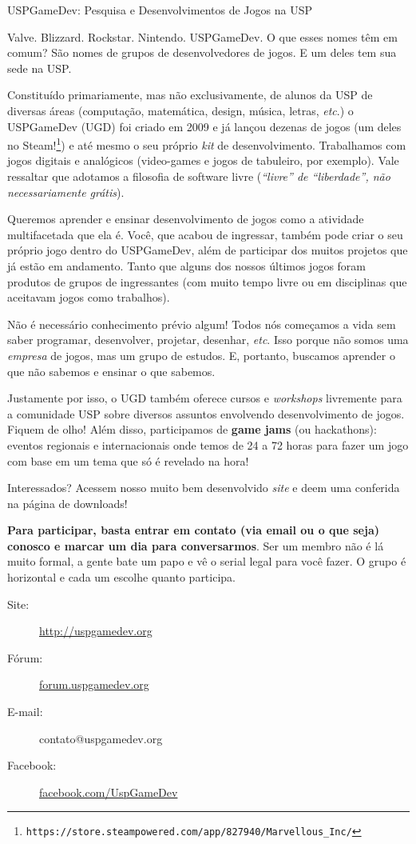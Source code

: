 \begin{subsecao}{USPGameDev: Pesquisa e Desenvolvimentos de Jogos na USP}


Valve. Blizzard. Rockstar. Nintendo. USPGameDev. O que esses nomes têm em comum?
São nomes de grupos de desenvolvedores de jogos. E um deles tem sua sede na USP.

Constituído primariamente, mas não exclusivamente, de alunos da USP de diversas
áreas (computação, matemática, design, música, letras, \textit{etc}.) o
USPGameDev (UGD) foi criado em 2009  e já lançou dezenas de jogos (um deles no 
Steam!\footnote{\texttt{https://store.steampowered.com/app/827940/Marvellous\_Inc/}}) 
e até mesmo o seu próprio \textit{kit} de desenvolvimento. Trabalhamos com jogos 
digitais e analógicos (video-games e jogos de tabuleiro, por exemplo). Vale 
ressaltar que adotamos a filosofia de software livre (\textit{``livre'' de 
``liberdade'', não necessariamente grátis}).

Queremos aprender e ensinar desenvolvimento de jogos como a atividade 
multifacetada que ela é. Você, que acabou de ingressar, também pode criar o seu 
próprio jogo dentro do USPGameDev, além de participar dos muitos projetos que já 
estão em andamento. Tanto que alguns dos nossos últimos jogos foram produtos de 
grupos de ingressantes (com muito tempo livre ou em disciplinas que aceitavam 
jogos como trabalhos). 

Não é necessário conhecimento prévio algum! Todos nós começamos a vida sem saber 
programar, desenvolver, projetar, desenhar, \textit{etc}. Isso porque não somos 
uma \textit{empresa} de jogos, mas um grupo de estudos. E, portanto, buscamos 
aprender o que não sabemos e ensinar o que sabemos.

Justamente por isso, o UGD também oferece cursos e \textit{workshops} livremente 
para a comunidade USP sobre diversos assuntos envolvendo desenvolvimento de 
jogos. Fiquem de olho! Além disso, participamos de \textbf{game jams} (ou 
hackathons): eventos regionais e internacionais onde temos de 24 a 72 horas para 
fazer um jogo com base em um tema que só é revelado na hora!

Interessados? Acessem nosso muito bem desenvolvido \textit{site} e deem uma 
conferida na página de downloads! 

\textbf{Para participar, basta entrar em contato (via email ou o que seja) 
conosco e marcar um dia para conversarmos}. Ser um membro não é lá muito formal, 
a gente bate um papo e vê o serial legal para você fazer. O grupo é horizontal e 
cada um escolhe quanto participa.

\begin{description}
  \item[Site:] \url{http://uspgamedev.org}
  \item[Fórum:] \url{forum.uspgamedev.org}
  \item[E-mail:] contato@uspgamedev.org
  \item[Facebook:] \url{facebook.com/UspGameDev}
\end{description}

\end{subsecao}
